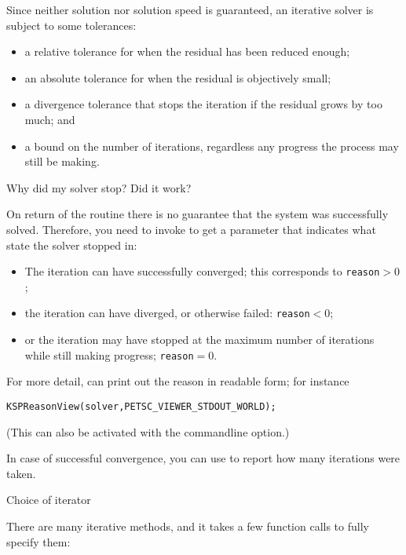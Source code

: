 Since neither
solution nor solution speed is guaranteed, an iterative solver is
subject to some tolerances:
\begin{itemize}
\item a relative tolerance for when the residual has been reduced
  enough;
\item an absolute tolerance for when the residual is objectively
  small;
\item a divergence tolerance that stops the iteration if the residual
  grows by too much; and
\item a bound on the number of iterations, regardless any progress the
  process may still be making.
\end{itemize}


 {Why did my solver stop? Did it work?}
\label{sec:ksp-reason}

On return of the  routine there is no guarantee
that the system was successfully solved.
Therefore, you need to invoke
to get a  parameter that indicates
what state the solver stopped in:
\begin{itemize}
\item The iteration can have successfully converged; this corresponds
  to \lstinline{reason}$>0$;
\item the iteration can have diverged, or otherwise failed: \lstinline{reason}$<0$;
\item or the iteration may have stopped at the maximum number of
  iterations while still making progress; \lstinline{reason}$=0$.
\end{itemize}
For more detail,  can print out the
reason in readable form; for instance
\begin{lstlisting}
KSPReasonView(solver,PETSC_VIEWER_STDOUT_WORLD);
\end{lstlisting}
(This can also be activated with the 
commandline option.)

In case of successful convergence, you can use 
to report how many
iterations were taken.

 {Choice of iterator}

There are many iterative methods, and it takes a few function calls to fully specify them:


